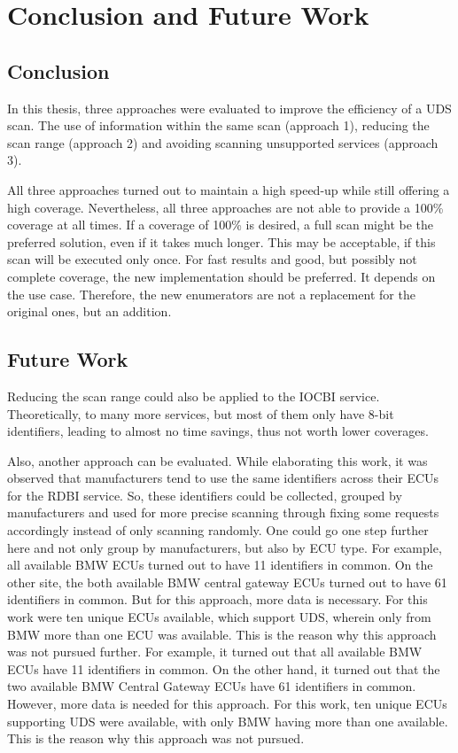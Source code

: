 \section{Conclusion and Future Work}

\subsection{Conclusion}

In this thesis, three approaches were evaluated to improve the efficiency of a UDS scan. The use of information within the same scan (approach 1), reducing the scan range (approach 2) and avoiding scanning unsupported services (approach 3).

All three approaches turned out to maintain a high speed-up while still offering a high coverage.
Nevertheless, all three approaches are not able to provide a 100\% coverage at all times. 
If a coverage of 100\% is desired, a full scan might be the preferred solution, even if it takes much longer. This may be acceptable, if this scan will be executed only once. For fast results and good, but possibly not complete coverage, the new implementation should be preferred. It depends on the use case. Therefore, the new enumerators are not a replacement for the original ones, but an addition.

\subsection{Future Work}

Reducing the scan range could also be applied to the IOCBI service. Theoretically, to many more services, but most of them only have 8-bit identifiers, leading to almost no time savings, thus not worth lower coverages.

Also, another approach can be evaluated. While elaborating this work, it was observed that manufacturers tend to use the same identifiers across their ECUs for the RDBI service. So, these identifiers could be collected, grouped by manufacturers and used for more precise scanning through fixing some requests accordingly instead of only scanning randomly. One could go one step further here and not only group by manufacturers, but also by ECU type.
For example, all available BMW ECUs turned out to have 11 identifiers in common. On the other site, the both available BMW central gateway ECUs turned out to have 61 identifiers in common. But for this approach, more data is necessary. For this work were ten unique ECUs available, which support UDS, wherein only from BMW more than one ECU was available. This is the reason why this approach was not pursued further.
For example, it turned out that all available BMW ECUs have 11 identifiers in common. On the other hand, it turned out that the two available BMW Central Gateway ECUs have 61 identifiers in common. However, more data is needed for this approach. For this work, ten unique ECUs supporting UDS were available, with only BMW having more than one available. This is the reason why this approach was not pursued.

